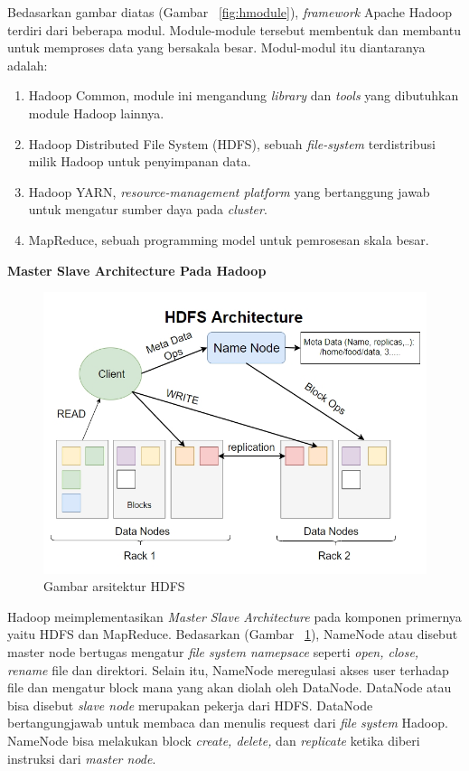 \documentclass[a4paper,twoside]{article}
\begin{document}
\begin{enumerate}
Bedasarkan gambar diatas (Gambar ~\ref{fig:hmodule}), {\it framework} Apache Hadoop terdiri dari beberapa modul. Module-module tersebut membentuk dan membantu untuk memproses data yang bersakala besar. Modul-modul itu diantaranya adalah:

\begin{enumerate}
\item Hadoop Common, module ini mengandung {\it library} dan {\it tools} yang dibutuhkan module Hadoop lainnya.

\item Hadoop Distributed File System (HDFS), sebuah \textit{file-system} terdistribusi milik Hadoop untuk penyimpanan data.

\item Hadoop YARN, {\it resource-management platform} yang bertanggung jawab untuk mengatur sumber daya pada {\it cluster}.

\item MapReduce, sebuah programming model untuk pemrosesan skala besar.

\end{enumerate}

\textbf{Master Slave Architecture Pada Hadoop}

\begin{figure}[H]
    \centering  
    \includegraphics[scale=0.6]{hdfshadoop}  
    \caption[Gambar arsitektur HDFS]{Gambar arsitektur HDFS} 
    \label{fig:hdfshadoop} 
\end{figure}

Hadoop meimplementasikan {\it Master Slave Architecture} pada komponen primernya yaitu HDFS dan MapReduce. Bedasarkan  (Gambar ~\ref{fig:hdfshadoop}), NameNode atau disebut master node bertugas mengatur {\it file system namepsace} seperti {\it open, close, rename} file dan direktori. Selain itu, NameNode meregulasi akses user terhadap file dan mengatur block mana yang akan diolah oleh DataNode. DataNode atau bisa disebut {\it slave node} merupakan pekerja dari HDFS. DataNode bertangungjawab untuk membaca dan menulis request dari {\it file system} Hadoop. NameNode bisa melakukan block {\it create, delete,} dan {\it replicate} ketika diberi instruksi dari {\it master node}. 


\end{enumerate}
\end{document}
